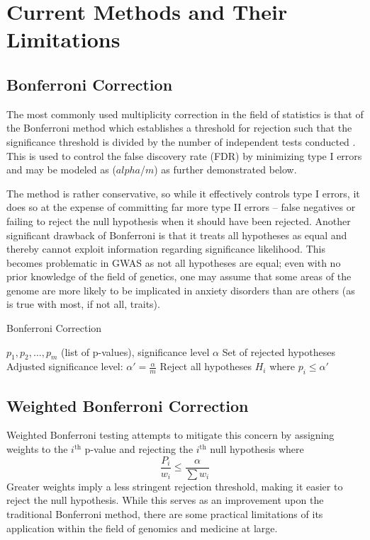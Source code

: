 \documentclass[12pt]{article}
\begin{document}
\newpage

\section{Current Methods and Their Limitations}
\subsection{Bonferroni Correction}
The most commonly used multiplicity correction in the field of statistics is that of the Bonferroni method which establishes a threshold for rejection such that the significance threshold is divided by the number of independent tests conducted \cite{CDC2015}. This is used to control the false discovery rate (FDR) by minimizing type I errors and may be modeled as ($alpha$/$m$) as further demonstrated below. \par

The method is rather conservative, so while it effectively controls type I errors, it does so at the expense of committing far more type II errors -- false negatives or failing to reject the null hypothesis when it should have been rejected. Another significant drawback of Bonferroni is that it treats all hypotheses as equal and thereby cannot exploit information regarding significance likelihood. This becomes problematic in GWAS as not all hypotheses are equal; even with no prior knowledge of the field of genetics, one may assume that some areas of the genome are more likely to be implicated in anxiety disorders than are others (as is true with most, if not all, traits). \par

\begin{algorithm}
    \caption{Bonferroni Correction}
    \begin{algorithmic}[1]
        \Require $p_1, p_2, \dots, p_m$ (list of p-values), significance level $\alpha$
        \Ensure Set of rejected hypotheses
        \State Adjusted significance level: $\alpha' = \frac{\alpha}{m}$
        \State Reject all hypotheses $H_i$ where $p_i \leq \alpha'$
    \end{algorithmic}
\end{algorithm}

\subsection{Weighted Bonferroni Correction}
Weighted Bonferroni testing attempts to mitigate this concern by assigning weights to the \(i^{\text{th}}\) p-value and rejecting the \(i^{\text{th}}\) null hypothesis where
\[
\frac{P_i}{w_i} \leq \frac{\alpha}{\sum w_i}
\]
Greater weights imply a less stringent rejection threshold, making it easier to reject the null hypothesis. While this serves as an improvement upon the traditional Bonferroni method, there are some practical limitations of its application within the field of genomics and medicine at large. \par
\end{document}
